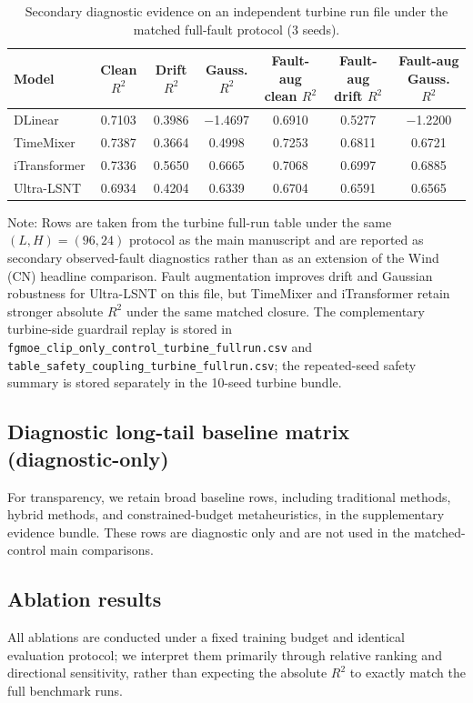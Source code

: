 \documentclass[review,1p,times]{elsarticle}
\newcommand{\aeTableNote}[1]{%
  \par\vspace{2pt}%
  \noindent\begin{minipage}{\linewidth}
    \raggedright\footnotesize
    Note: #1
  \end{minipage}%
  \par
}
\begin{document}
\begin{table}[t]
\centering
\caption{Secondary diagnostic evidence on an independent turbine run file under the matched full-fault protocol (3 seeds).}
\label{tab:turbine_observed_faults}
\footnotesize
\setlength{\tabcolsep}{3.6pt}
\begin{tabular*}{0.98\linewidth}{@{\extracolsep{\fill}}lcccccc@{}}
\toprule
\textbf{Model} & \textbf{Clean $R^2$} & \textbf{Drift $R^2$} & \textbf{Gauss. $R^2$} & \textbf{Fault-aug clean $R^2$} & \textbf{Fault-aug drift $R^2$} & \textbf{Fault-aug Gauss. $R^2$} \\
\midrule
DLinear & 0.7103 & 0.3986 & $-$1.4697 & 0.6910 & 0.5277 & $-$1.2200 \\
TimeMixer & 0.7387 & 0.3664 & 0.4998 & 0.7253 & 0.6811 & 0.6721 \\
iTransformer & 0.7336 & 0.5650 & 0.6665 & 0.7068 & 0.6997 & 0.6885 \\
Ultra-LSNT & 0.6934 & 0.4204 & 0.6339 & 0.6704 & 0.6591 & 0.6565 \\
\bottomrule
\end{tabular*}
\aeTableNote{Rows are taken from the turbine full-run table under the same $(L,H)=(96,24)$ protocol as the main manuscript and are reported as secondary observed-fault diagnostics rather than as an extension of the Wind (CN) headline comparison. Fault augmentation improves drift and Gaussian robustness for Ultra-LSNT on this file, but TimeMixer and iTransformer retain stronger absolute $R^2$ under the same matched closure. The complementary turbine-side guardrail replay is stored in \texttt{fgmoe\_clip\_only\_control\_turbine\_fullrun.csv} and \texttt{table\_safety\_coupling\_turbine\_fullrun.csv}; the repeated-seed safety summary is stored separately in the 10-seed turbine bundle.}
\end{table}


\subsection{Diagnostic long-tail baseline matrix (diagnostic-only)}
\label{subsec:diag_longtail}
For transparency, we retain broad baseline rows, including traditional methods, hybrid methods, and constrained-budget metaheuristics, in the supplementary evidence bundle. These rows are diagnostic only and are not used in the matched-control main comparisons.


\subsection{Ablation results}
\label{subsec:results_ablation}
All ablations are conducted under a fixed training budget and identical evaluation protocol; we interpret them primarily through relative ranking and directional sensitivity, rather than expecting the absolute $R^2$ to exactly match the full benchmark runs.
\end{document}
